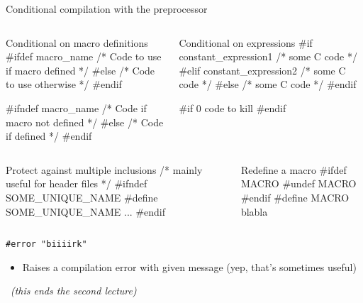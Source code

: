 \begin{frame}[fragile]{Conditional compilation with the preprocessor}
  \begin{columns}
\begin{column}{.45\linewidth}
  \begin{boitecode}{Conditional on macro definitions}
#ifdef macro_name
  /* Code to use if macro defined */
#else
  /* Code to use otherwise */
#endif

#if\alert{n}def macro_name
  /* Code if macro not defined */
#else
  /* Code if defined */
#endif
  \end{boitecode}      
    \end{column}
    \begin{column}{.45\linewidth}
  \begin{boitecode}{Conditional on expressions}
#if constant_expression1
  /* some C code */
#elif constant_expression2
  /* some C code */
#else
  /* some C code */
#endif

#if 0
  code to kill
#endif
  \end{boitecode}      
\end{column}
  \end{columns}

  \begin{columns}
    \begin{column}{.45\linewidth}
      \begin{boitecode}{Protect against multiple inclusions}
/* mainly useful for header files */
#ifndef SOME_UNIQUE_NAME
#define SOME_UNIQUE_NAME        
   ... 
#endif
      \end{boitecode}
    \end{column}
    \begin{column}{.45\linewidth}

      \begin{boitecode}{Redefine a macro}
#ifdef MACRO
#undef MACRO
#endif
#define MACRO blabla        
      \end{boitecode}
    \end{column}
  \end{columns}
  
  \begin{block}{\texttt{\#error "biiiirk"}}
    \begin{itemize}\vspace{-.5\baselineskip}
    \item Raises a compilation error with given message (yep, that's sometimes
      useful)
    \end{itemize}
  \end{block}
\end{frame}


  ~\hfill\textit{(this ends the second lecture)}
\toc